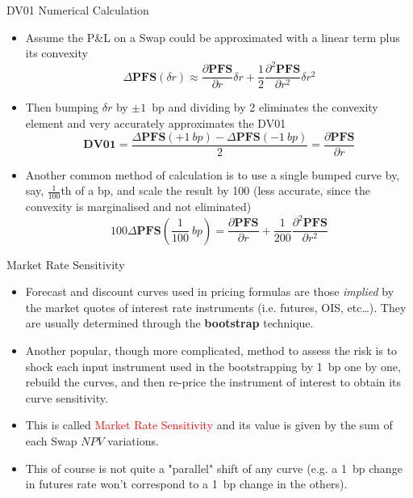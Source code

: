 \documentclass{beamer}
\begin{document}
\begin{frame}{DV01 Numerical Calculation}
\begin{itemize}
	\item<1-> Assume the P\&L on a Swap could be approximated with a linear term plus its convexity
	\begin{equation*}
	\Delta \textbf{PFS}(\delta r)\approx \frac{\partial \textbf{PFS} }{\partial r}\delta r + \frac{1}{2}\frac{\partial^2 \textbf{PFS}}{\partial r^2}\delta r^2
	\end{equation*}
	\item<2-> Then bumping $\delta r$ by $\pm 1$~bp and dividing by 2 eliminates the convexity element and very accurately approximates the DV01
	\begin{equation*}
	\textbf{DV01} = \frac{\Delta \textbf{PFS}(+1~bp)-\Delta \textbf{PFS}(-1~bp)}{2}=\frac{\partial \textbf{PFS} }{\partial r}
	\end{equation*}
	\item<3-> Another common method of calculation is to use a single bumped curve by, say, $\frac{1}{100}$th of a bp, and scale the result by 100 (less accurate, since the convexity is marginalised and not eliminated)
	\begin{equation*}
	100\Delta \textbf{PFS}\left(\frac{1}{100}~bp\right)=\frac{\partial \textbf{PFS}}{\partial r}+\frac{1}{200}\frac{\partial^2\textbf{PFS}}{\partial r^2}
	\end{equation*}
	\end{itemize}
\end{frame}

\begin{frame}{Market Rate Sensitivity}
\begin{itemize}
	\item<1-> Forecast and discount curves used in pricing formulas are those \emph{implied} by the market quotes of interest rate instruments (i.e. futures, OIS, etc\ldots). They are usually determined through the \textbf{bootstrap} technique.
	\item<2-> Another popular, though more complicated, method to assess the risk is to shock each input instrument used in the bootstrapping by 1~bp one by one, rebuild the curves, and then re-price the instrument of interest to obtain its curve sensitivity. 
	\item<3-> This is called \textcolor{red}{Market Rate Sensitivity} and its value is given by the sum of each Swap $NPV$ variations.
	\item<4-> This of course is not quite a "parallel" shift of any curve (e.g. a 1~bp change in futures rate won't correspond to a 1~bp change in the others).
\end{itemize}
\end{frame}
\end{document}
